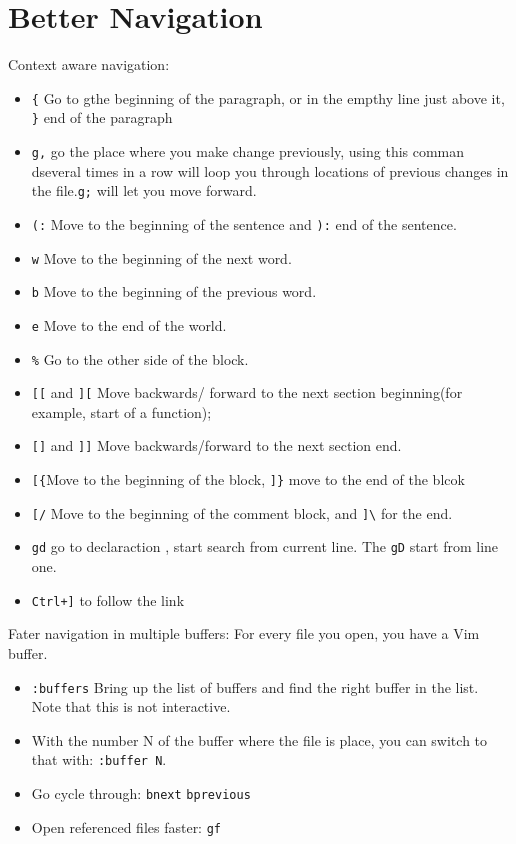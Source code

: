 \documentclass[11pt]{book}
\begin{document}
 \chapter{Better Navigation}
 Context aware navigation:
 \begin{itemize}
 \item \verb|{| Go to gthe beginning of the paragraph, or in the empthy line
  just above it, \verb|}| end of the paragraph
 \item \verb|g,| go the place where you make change previously, using this
 comman dseveral times in a row will loop you through locations of previous
 changes in the file.\verb|g;| will let you move forward.
 \item \verb|(:| Move to the beginning of the sentence and \verb|):| end of the
 sentence.
 \item \verb|w| Move to the beginning of the next word.
 \item \verb|b| Move to the beginning of the previous word.
 \item \verb|e| Move to the end of the world.
 \item \verb|%| Go to the other side of the block.
 \item \verb|[[| and \verb|][| Move backwards/ forward to the next section
 beginning(for example, start of a function);
 \item \verb|[]| and \verb|]]| Move backwards/forward to the next section end.
 \item \verb|[{|Move to the beginning of the block, \verb|]}| move to the end of
 the blcok
 \item \verb|[/| Move to the beginning of the comment block, and \verb|]\| for
 the end.
 \item \verb|gd| go to declaraction , start search from current line. The 
 \verb|gD| start from line one. 
 \item \verb|Ctrl+]| to follow the link
 \end{itemize}

 Fater navigation in multiple buffers:
 For every file you open, you have a Vim buffer.
 \begin{itemize}
 \item \verb|:buffers| Bring up the list of buffers and find the right buffer in
 the list. Note that this is not interactive.
 \item With the number N of the buffer where the file is place, you can switch
 to that with: \verb|:buffer N|.
 \item Go cycle through: \verb|bnext| \verb|bprevious|
 \item Open referenced files faster: \verb|gf|
 \end{itemize}
\end{document}
